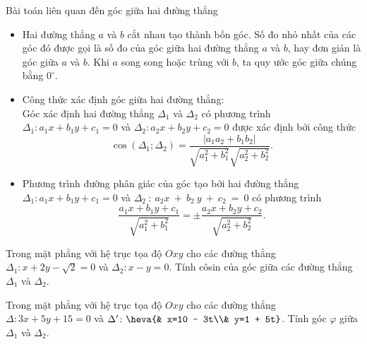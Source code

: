\begin{dang}{Bài toán liên quan đến góc giữa hai đường thẳng}
	\begin{itemize}
		\item Hai đường thẳng $a$ và $b$ cắt nhau tạo thành bốn góc. Số đo nhỏ nhất của các góc đó được gọi là số đo của góc giữa hai đường thẳng $a$ và $b$, hay đơn giản là góc giữa $a$ và $b$. Khi $a$ song song hoặc trùng với $b$, ta quy ước góc giữa chúng bằng $0^{\circ}$.
		\item Công thức xác định góc giữa hai đường thẳng:\\
		Góc xác định hai đường thẳng $ \Delta_1$ và $ \Delta_2$ có phương trình $ \Delta_1\colon a_1x+b_1y+c_1=0$ và $ \Delta_2\colon a_2x+b_2y+c_2=0$ được xác định bởi công thức $$\cos \left( \Delta_1; \Delta_2\right)=\dfrac{|a_1a_2+b_1b_2|}{\sqrt{a_1^2+b_1^2}\sqrt{a_2^2+b_2^2}}.$$
		\item Phương trình đường phân giác của góc tạo bởi hai đường thẳng $ \Delta_1\colon a_1x+b_1y+c_1=0$ và $ \Delta_2~\colon~ a_2x~+~b_2~y~+~c_2~=~0$ có phương trình
		$$\dfrac{a_1x+b_1y+c_1}{\sqrt{a_1^2+b_1^2}}=\pm \dfrac{a_2x+b_2y+c_2}{\sqrt{a_2^2+b_2^2}}.$$
	\end{itemize}
	
\end{dang}
\begin{vd}
	Trong mặt phẳng với hệ trục tọa độ $Oxy$ cho các đường thẳng $\Delta_1:x+2y-\sqrt{2}=0$ và $\Delta_2:x-y=0$. Tính côsin của góc giữa các đường thẳng $\Delta_1$ và $\Delta_2$.
\end{vd}
\begin{vd}
	Trong mặt phẳng với hệ trục tọa độ $Oxy$ cho các đường thẳng $\Delta\colon3x +5y + 15=0$ và $\Delta'\colon\heva{& x=10 - 3t\\& y=1 + 5t}$. Tính góc $\varphi$ giữa $\Delta_1$ và $\Delta_2$.
\end{vd}
